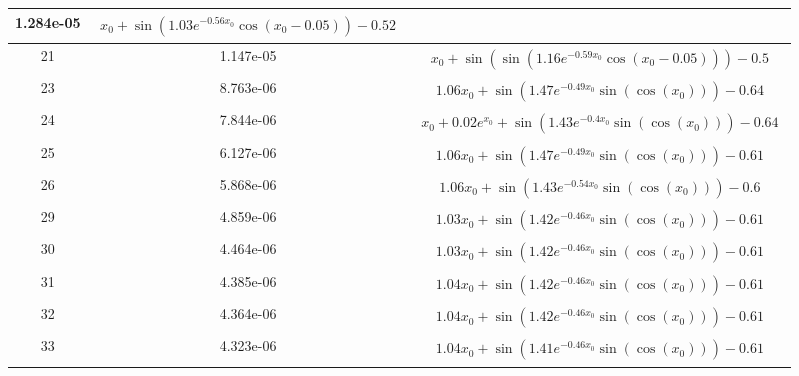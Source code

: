 \begin{center}
\begin{tabular}{|c|c|c|}
1.284e-05 & $\begin{aligned}x_{0} + \sin{\left(1.03 e^{- 0.56 x_{0}} \cos{\left(x_{0} - 0.05 \right)} \right)} - 0.52\end{aligned}$\\ \hline21 & 1.147e-05 & $\begin{aligned}x_{0} + \sin{\left(\sin{\left(1.16 e^{- 0.59 x_{0}} \cos{\left(x_{0} - 0.05 \right)} \right)} \right)} - 0.5\end{aligned}$\\ \hline23 & 8.763e-06 & $\begin{aligned}1.06 x_{0} + \sin{\left(1.47 e^{- 0.49 x_{0}} \sin{\left(\cos{\left(x_{0} \right)} \right)} \right)} - 0.64\end{aligned}$\\ \hline24 & 7.844e-06 & $\begin{aligned}x_{0} + 0.02 e^{x_{0}} + \sin{\left(1.43 e^{- 0.4 x_{0}} \sin{\left(\cos{\left(x_{0} \right)} \right)} \right)} - 0.64\end{aligned}$\\ \hline25 & 6.127e-06 & $\begin{aligned}1.06 x_{0} + \sin{\left(1.47 e^{- 0.49 x_{0}} \sin{\left(\cos{\left(x_{0} \right)} \right)} \right)} - 0.61\end{aligned}$\\ \hline26 & 5.868e-06 & $\begin{aligned}1.06 x_{0} + \sin{\left(1.43 e^{- 0.54 x_{0}} \sin{\left(\cos{\left(x_{0} \right)} \right)} \right)} - 0.6\end{aligned}$\\ \hline29 & 4.859e-06 & $\begin{aligned}1.03 x_{0} + \sin{\left(1.42 e^{- 0.46 x_{0}} \sin{\left(\cos{\left(x_{0} \right)} \right)} \right)} - 0.61\end{aligned}$\\ \hline30 & 4.464e-06 & $\begin{aligned}1.03 x_{0} + \sin{\left(1.42 e^{- 0.46 x_{0}} \sin{\left(\cos{\left(x_{0} \right)} \right)} \right)} - 0.61\end{aligned}$\\ \hline31 & 4.385e-06 & $\begin{aligned}1.04 x_{0} + \sin{\left(1.42 e^{- 0.46 x_{0}} \sin{\left(\cos{\left(x_{0} \right)} \right)} \right)} - 0.61\end{aligned}$\\ \hline32 & 4.364e-06 & $\begin{aligned}1.04 x_{0} + \sin{\left(1.42 e^{- 0.46 x_{0}} \sin{\left(\cos{\left(x_{0} \right)} \right)} \right)} - 0.61\end{aligned}$\\ \hline33 & 4.323e-06 & $\begin{aligned}1.04 x_{0} + \sin{\left(1.41 e^{- 0.46 x_{0}} \sin{\left(\cos{\left(x_{0} \right)} \right)} \right)} - 0.61\end{aligned}$\\ \hline\end{tabular}
        \end{center}
        